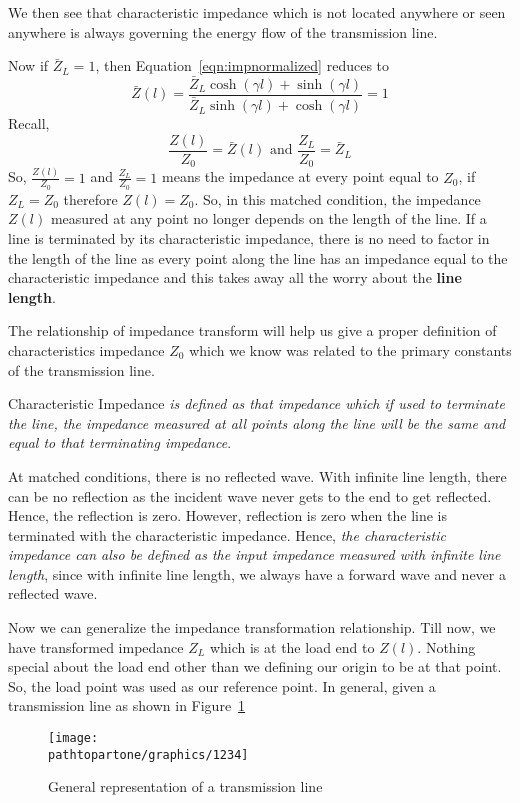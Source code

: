 We then see that characteristic impedance which is not located anywhere or seen anywhere is always governing the energy flow of the transmission line.

Now if $\bar{Z}_L = 1$, then Equation~\eqref{eqn:impnormalized} reduces to
\begin{dmath*}
\bar{Z}(l) = {\frac{\bar{Z}_L\cosh(\gamma l) + \sinh(\gamma l)}{\bar{Z}_L\sinh(\gamma l) + \cosh(\gamma l)}} = 1
\end{dmath*}
Recall,
\[\frac{Z(l)}{Z_0} = \bar{Z}(l)\text{ and }\frac{Z_L}{Z_0} = \bar{Z}_L\]
So, $\frac{Z(l)}{Z_0} = 1$ and $\frac{Z_L}{Z_0} = 1$ means the impedance at every point equal to $Z_0$, if $Z_L = Z_0$ therefore $Z(l) = Z_0$. So, in this matched condition, the impedance $Z(l)$ measured at any point no longer depends on the length of the line. If a line is terminated by its characteristic impedance, there is no need to factor in the length of the line as every point along the line has an impedance equal to the characteristic impedance and this takes away all the worry about the \textbf{line length}.

The relationship of impedance transform will help us give a proper definition of characteristics impedance $Z_0$ which we know was related to the primary constants of the transmission line.

Characteristic Impedance \emph{is defined as that impedance which if used to terminate the line, the impedance measured at all points along the line will be the same and equal to that terminating impedance}.

At matched conditions, there is no reflected wave. With infinite line length, there can be no reflection as the incident wave never gets to the end to get reflected. Hence, the reflection is zero. However, reflection is zero when the line is terminated with the characteristic impedance. Hence, \emph{the characteristic impedance can also be defined as the input impedance measured with infinite line length}, since with infinite line length, we always have a forward wave and never a reflected wave.

Now we can generalize the impedance transformation relationship. Till now, we have transformed impedance $Z_L$ which is at the load end to $Z(l)$. Nothing special about the load end other than we defining our origin to be at that point. So, the load point was used as our reference point. In general, given a transmission line as shown in Figure~\ref{fig:1234}
\begin{figure}[h]
\centering
\texttt{[image: \\pathtopartone/graphics/1234]}
\caption{General representation of a transmission line}
\label{fig:1234}
\end{figure}

